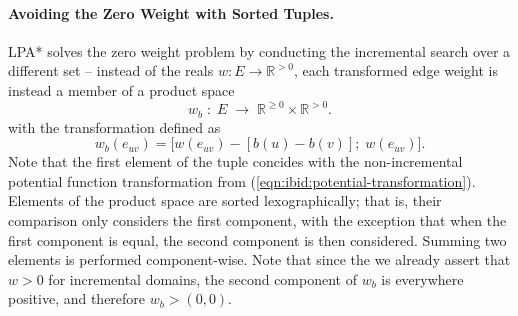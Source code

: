 \paragraph{Avoiding the Zero Weight with Sorted Tuples.}
LPA* solves the zero weight problem by conducting the incremental
search over a different set --
instead of the reals $w : E \rightarrow \mathbb{R}^{> 0}$,
each transformed edge weight is instead a member of a product space
\begin{equation}
   w_b \;:\; E \;\rightarrow\; \mathbb{R}^{\geq 0} \!\times\! \mathbb{R}^{> 0}.
\end{equation}
with the transformation defined as
\begin{equation}
   w_b(e_{uv}) = \big[ w(e_{uv}) - [b(u) - b(v)]; \; w(e_{uv}) \big].
   \label{eqn:ibid:incremental-potential-key}
\end{equation}
Note that the first element of the tuple concides with the
non-incremental potential function transformation from
(\ref{eqn:ibid:potential-transformation}).
Elements of the product space are sorted lexographically;
that is, their comparison only considers the first component,
with the exception that when the first component is equal,
the second component is then considered.
Summing two elements is performed component-wise.
Note that since the we already assert that $w > 0$ for incremental
domains,
the second component of $w_b$ is everywhere positive,
and therefore $w_b > (0,0)$.


